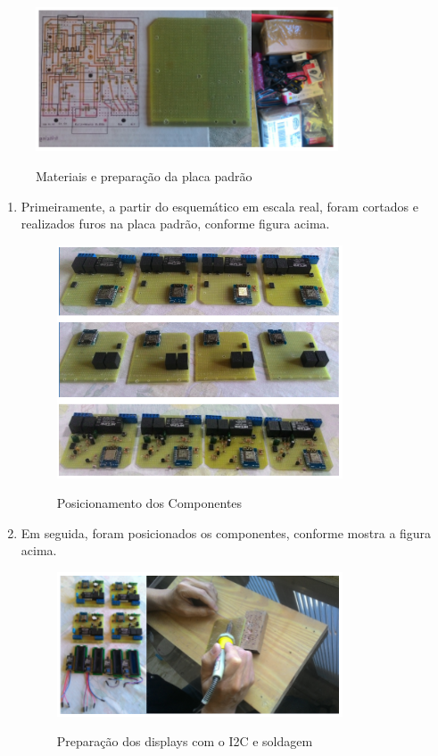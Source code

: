 \begin{figure}[H]
	\centering
	\caption{Materiais e preparação da placa padrão}
	\includegraphics[width=0.8\textwidth]{materiaisPrepPlaca}
	\label{fig:materiaisPrepPlaca}
\end{figure}

\begin{enumerate}
	\item Primeiramente, a partir do esquemático em escala real, foram cortados e realizados furos na placa padrão, conforme figura acima.
	
	\begin{figure}[H]
		\centering
		\caption{Posicionamento dos Componentes}
		\includegraphics[width=0.8\textwidth]{PosicionamentoComp}
		\label{fig:PosicionamentoComp}
	\end{figure}
	
	\item Em seguida, foram posicionados os componentes, conforme mostra a figura acima.
	
	\begin{figure}[H]
		\centering
		\caption{Preparação dos displays com o I2C e soldagem}
		\includegraphics[width=0.8\textwidth]{PrepI2CSoldagem}
		\label{fig:PrepI2CSoldagem}
	\end{figure}
	

\end{enumerate}
